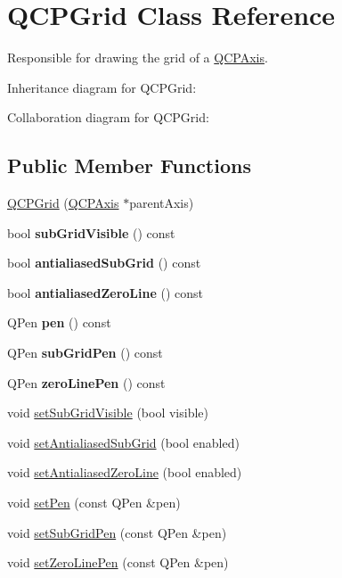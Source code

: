 \hypertarget{classQCPGrid}{}\section{Q\+C\+P\+Grid Class Reference}
\label{classQCPGrid}


Responsible for drawing the grid of a \hyperlink{classQCPAxis}{Q\+C\+P\+Axis}.  




Inheritance diagram for Q\+C\+P\+Grid\+:


Collaboration diagram for Q\+C\+P\+Grid\+:
\subsection*{Public Member Functions}
\begin{DoxyCompactItemize}
\item 
\hyperlink{classQCPGrid_acd1cdd2909625388a13048b698494a17}{Q\+C\+P\+Grid} (\hyperlink{classQCPAxis}{Q\+C\+P\+Axis} $\ast$parent\+Axis)
\item 
\mbox{\label{classQCPGrid_afface6d8cb6df3cbdc0b5c7c2658f96a}} 
bool {\bfseries sub\+Grid\+Visible} () const
\item 
\mbox{\label{classQCPGrid_af16a269b15b2a8d904be087d060536bc}} 
bool {\bfseries antialiased\+Sub\+Grid} () const
\item 
\mbox{\label{classQCPGrid_a578d0bd4d2e5000a2ca69b9a034d59aa}} 
bool {\bfseries antialiased\+Zero\+Line} () const
\item 
\mbox{\label{classQCPGrid_a1d68418766b3408c0b7b29ef40b04c2a}} 
Q\+Pen {\bfseries pen} () const
\item 
\mbox{\label{classQCPGrid_ae231e5b87e68689a666f90531a15552f}} 
Q\+Pen {\bfseries sub\+Grid\+Pen} () const
\item 
\mbox{\label{classQCPGrid_a85f248487110c4043be696aef5f2f6e1}} 
Q\+Pen {\bfseries zero\+Line\+Pen} () const
\item 
void \hyperlink{classQCPGrid_ad4ad6bf714ec45e08845456355a1b700}{set\+Sub\+Grid\+Visible} (bool visible)
\item 
void \hyperlink{classQCPGrid_a5692310ba183721a413d60951407d114}{set\+Antialiased\+Sub\+Grid} (bool enabled)
\item 
void \hyperlink{classQCPGrid_a3cc6d54647393ee71afb6da56af07aa4}{set\+Antialiased\+Zero\+Line} (bool enabled)
\item 
void \hyperlink{classQCPGrid_aa05ab9816ffb440908171e45e833b593}{set\+Pen} (const Q\+Pen \&pen)
\item 
void \hyperlink{classQCPGrid_a9edd3593f384d1f0b0202a39cef4453d}{set\+Sub\+Grid\+Pen} (const Q\+Pen \&pen)
\item 
void \hyperlink{classQCPGrid_a209f40fdb252397b418b82d3494d8ea0}{set\+Zero\+Line\+Pen} (const Q\+Pen \&pen)
\end{DoxyCompactItemize}
